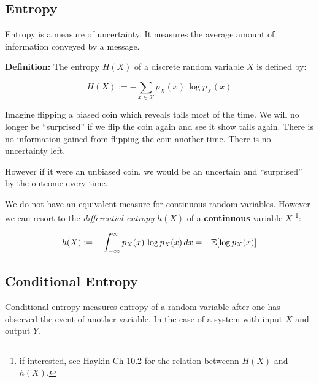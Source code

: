 \subsection{Entropy}

Entropy is a measure of uncertainty. It measures the average amount of information conveyed by a message.

\textbf{Definition:} 
The entropy $H(X)$ of a discrete random variable $X$ is defined by:

\begin{equation}
\label{eq:entropy}
H(X) := - \sum_{x \in \mathcal X} p_X(x)\,\log p_X(x)
\end{equation}

Imagine flipping a biased coin which reveals tails most of the time. 
We will no longer be ``surprised'' if we flip the coin again and see it show tails again. 
There is no information gained from flipping the coin another time. There is no uncertainty left.

However if it were an unbiased coin, we would be an uncertain and ``surprised'' by the outcome every time.

We do not have an equivalent measure for continuous random variables. 
However we can resort to the \emph{differential entropy} $h(X)$ of a \textbf{continuous} variable $X$
\footnote{if interested, see Haykin Ch 10.2 for the relation betweenn $H(X)$ and $h(X)$.}:

\begin{equation}
\label{eq:entropydiff}
h(X) := - \int_{-\infty}^{\infty} p_X(x)\,\log p_X(x) \, dx 
= - \mathbb{E} \lbrack \log p_X(x) \rbrack
\end{equation}




\subsection{Conditional Entropy}

Conditional entropy measures entropy of a random variable after one has observed the event of another variable.
In the case of a system with input $X$ and output $Y$.


